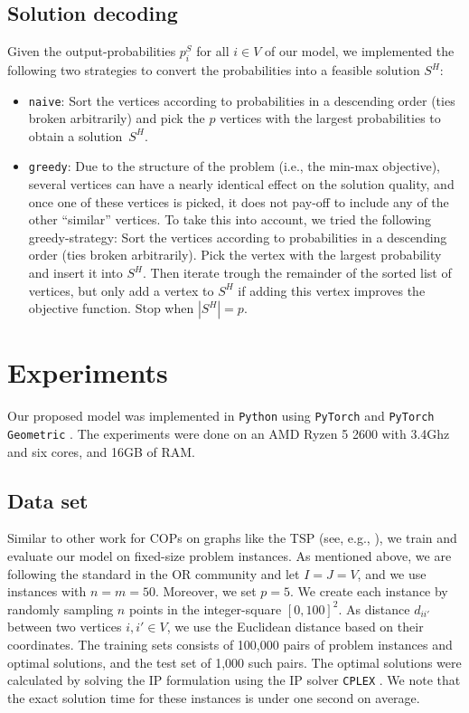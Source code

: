 \documentclass[]{article}
\newcommand{\loc}{J}
\newcommand{\cus}{I}
\begin{document}
\newcommand{\naive}{\texttt{naive}}
\newcommand{\greedy}{\texttt{greedy}}

\subsection{Solution decoding}

Given the output-probabilities $p^S_i$ for all $i \in V$ of our model, we 
implemented the following two strategies to convert the probabilities into a 
feasible solution $S^H$:

\begin{itemize}
	\item \naive: Sort the vertices according to probabilities in a descending 
	order (ties broken arbitrarily) and pick the $p$ vertices with the largest 
	probabilities to obtain a solution~$S^H$.
	\item \greedy: Due to the structure of the problem (i.e., the min-max 
	objective), several vertices can have a nearly identical effect on the 
	solution quality, and once one of these vertices is picked, it does not 
	pay-off to include any of the other ``similar'' vertices. To take this into 
	account, we tried the following greedy-strategy: Sort the vertices 
	according 
	to probabilities in a descending order (ties broken arbitrarily). Pick the 
	vertex with the largest probability and insert it into $S^H$. Then iterate 
	trough the remainder of the sorted list of vertices, but only add a vertex 
	to 
	$S^H$ if adding this vertex improves the objective function. Stop when 
	$|S^H|=p$.
\end{itemize}

\section{Experiments}

Our proposed model was implemented in \texttt{Python} using \texttt{PyTorch} \cite{paszke2019pytorch} and \texttt{PyTorch Geometric} \cite{fey2019fast}. The experiments were done on an AMD Ryzen 5 2600 with 3.4Ghz and six cores, and 16GB of RAM.

\subsection{Data set}

Similar to other work for COPs on graphs like the TSP (see, e.g., 
\cite{vinyals2015pointer,joshi2019efficient,joshi2020learning}), we train and 
evaluate our model on fixed-size problem instances. As mentioned above, we are 
following the standard in the OR community and let $\cus=\loc=V$, and we use 
instances with $n=m=50$. Moreover, we set $p=5$. We create each instance by 
randomly sampling $n$ points in the integer-square $[0,100]^2$. As distance 
$d_{ii'}$ between two vertices $i,i' \in V$, we use the Euclidean distance 
based on 
their coordinates. The training sets consists of 100,000 pairs of problem 
instances and optimal solutions, and the test set of 1,000 such pairs. The 
optimal solutions were calculated by solving the IP formulation using the IP 
solver \texttt{CPLEX} \cite{noauthor_cplex_nodate}. We note that the exact 
solution time for these instances is under one second on average.
\end{document}
